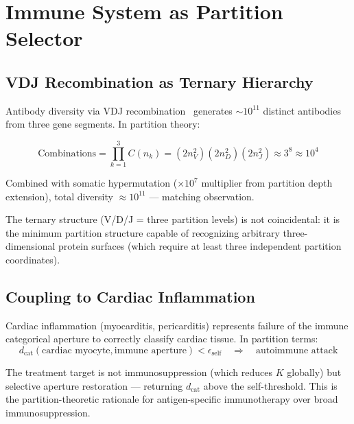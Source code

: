 \documentclass[10pt,twocolumn,a4paper]{article}
\theoremstyle{definition}
\newcommand{\dcat}{d_{\text{cat}}}
\begin{document}
\section{Immune System as Partition Selector}
\label{sec:immune}

\subsection{VDJ Recombination as Ternary Hierarchy}

Antibody diversity via VDJ recombination~\cite{tonegawa1983somatic,janeway2001immunobiology} generates $\sim 10^{11}$ distinct
antibodies from three gene segments. In partition theory:

\begin{equation}
\text{Combinations} = \prod_{k=1}^3 C(n_k) = (2n_V^2)(2n_D^2)(2n_J^2) \approx 3^8 \approx 10^4
\end{equation}

Combined with somatic hypermutation ($\times 10^7$ multiplier from partition
depth extension), total diversity $\approx 10^{11}$ — matching observation.

The ternary structure (V/D/J = three partition levels) is not coincidental:
it is the minimum partition structure capable of recognizing arbitrary
three-dimensional protein surfaces (which require at least three independent
partition coordinates).

\subsection{Coupling to Cardiac Inflammation}

Cardiac inflammation (myocarditis, pericarditis) represents failure of
the immune categorical aperture to correctly classify cardiac tissue.
In partition terms:
\begin{equation}
\dcat(\text{cardiac myocyte}, \text{immune aperture}) < \epsilon_{\text{self}}
\quad \Rightarrow \quad \text{autoimmune attack}
\end{equation}

The treatment target is not immunosuppression (which reduces $K$ globally)
but selective aperture restoration — returning $\dcat$ above the self-threshold.
This is the partition-theoretic rationale for antigen-specific immunotherapy
over broad immunosuppression.

\end{document}
